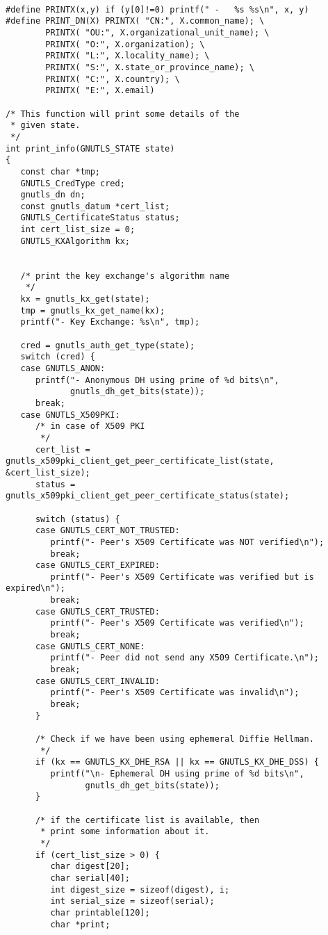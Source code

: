 \begin{verbatim}

#define PRINTX(x,y) if (y[0]!=0) printf(" -   %s %s\n", x, y)
#define PRINT_DN(X) PRINTX( "CN:", X.common_name); \
        PRINTX( "OU:", X.organizational_unit_name); \
        PRINTX( "O:", X.organization); \
        PRINTX( "L:", X.locality_name); \
        PRINTX( "S:", X.state_or_province_name); \
        PRINTX( "C:", X.country); \
        PRINTX( "E:", X.email)

/* This function will print some details of the
 * given state.
 */
int print_info(GNUTLS_STATE state)
{
   const char *tmp;
   GNUTLS_CredType cred;
   gnutls_dn dn;
   const gnutls_datum *cert_list;
   GNUTLS_CertificateStatus status;
   int cert_list_size = 0;
   GNUTLS_KXAlgorithm kx;


   /* print the key exchange's algorithm name
    */
   kx = gnutls_kx_get(state);
   tmp = gnutls_kx_get_name(kx);
   printf("- Key Exchange: %s\n", tmp);

   cred = gnutls_auth_get_type(state);
   switch (cred) {
   case GNUTLS_ANON:
      printf("- Anonymous DH using prime of %d bits\n",
             gnutls_dh_get_bits(state));
      break;
   case GNUTLS_X509PKI:
      /* in case of X509 PKI
       */
      cert_list = gnutls_x509pki_client_get_peer_certificate_list(state, &cert_list_size);
      status = gnutls_x509pki_client_get_peer_certificate_status(state);

      switch (status) {
      case GNUTLS_CERT_NOT_TRUSTED:
         printf("- Peer's X509 Certificate was NOT verified\n");
         break;
      case GNUTLS_CERT_EXPIRED:
         printf("- Peer's X509 Certificate was verified but is expired\n");
         break;
      case GNUTLS_CERT_TRUSTED:
         printf("- Peer's X509 Certificate was verified\n");
         break;
      case GNUTLS_CERT_NONE:
         printf("- Peer did not send any X509 Certificate.\n");
         break;
      case GNUTLS_CERT_INVALID:
         printf("- Peer's X509 Certificate was invalid\n");
         break;
      }

      /* Check if we have been using ephemeral Diffie Hellman.
       */
      if (kx == GNUTLS_KX_DHE_RSA || kx == GNUTLS_KX_DHE_DSS) {
         printf("\n- Ephemeral DH using prime of %d bits\n",
                gnutls_dh_get_bits(state));
      }

      /* if the certificate list is available, then
       * print some information about it.
       */
      if (cert_list_size > 0) {
         char digest[20];
         char serial[40];
         int digest_size = sizeof(digest), i;
         int serial_size = sizeof(serial);
         char printable[120];
         char *print;


\end{verbatim}
